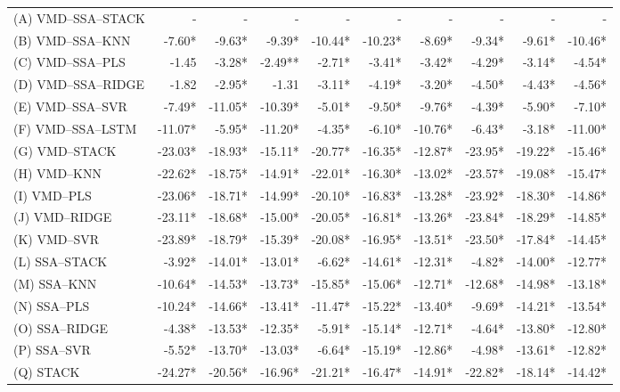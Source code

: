 {\begin{longtable}[htb!]{lrrrrrrrrr}
(A) VMD--SSA--STACK & -       & -       & -        & -       & -       & -       & -       & -       & -       \\
(B) VMD--SSA--KNN   & -7.60*  & -9.63*  & -9.39*   & -10.44* & -10.23* & -8.69*  & -9.34*  & -9.61*  & -10.46* \\
(C) VMD--SSA--PLS   & -1.45   & -3.28*  & -2.49**  & -2.71*  & -3.41*  & -3.42*  & -4.29*  & -3.14*  & -4.54*  \\
(D) VMD--SSA--RIDGE & -1.82   & -2.95*  & -1.31    & -3.11*  & -4.19*  & -3.20*  & -4.50*  & -4.43*  & -4.56*  \\
(E) VMD--SSA--SVR   & -7.49*  & -11.05* & -10.39*  & -5.01*  & -9.50*  & -9.76*  & -4.39*  & -5.90*  & -7.10*  \\
(F) VMD--SSA--LSTM  & -11.07* & -5.95*  & -11.20*  & -4.35*  & -6.10*  & -10.76* & -6.43*  & -3.18*  & -11.00* \\        
(G) VMD--STACK      & -23.03* & -18.93* & -15.11*  & -20.77* & -16.35* & -12.87* & -23.95* & -19.22* & -15.46* \\
(H) VMD--KNN        & -22.62* & -18.75* & -14.91*  & -22.01* & -16.30* & -13.02* & -23.57* & -19.08* & -15.47* \\
(I) VMD--PLS        & -23.06* & -18.71* & -14.99*  & -20.10* & -16.83* & -13.28* & -23.92* & -18.30* & -14.86* \\
(J) VMD--RIDGE      & -23.11* & -18.68* & -15.00*  & -20.05* & -16.81* & -13.26* & -23.84* & -18.29* & -14.85* \\
(K) VMD--SVR        & -23.89* & -18.79* & -15.39*  & -20.08* & -16.95* & -13.51* & -23.50* & -17.84* & -14.45* \\
(L) SSA--STACK      & -3.92*  & -14.01* & -13.01*  & -6.62*  & -14.61* & -12.31* & -4.82*  & -14.00* & -12.77* \\
(M) SSA--KNN        & -10.64* & -14.53* & -13.73*  & -15.85* & -15.06* & -12.71* & -12.68* & -14.98* & -13.18* \\
(N) SSA--PLS        & -10.24* & -14.66* & -13.41*  & -11.47* & -15.22* & -13.40* & -9.69*  & -14.21* & -13.54* \\
(O) SSA--RIDGE      & -4.38*  & -13.53* & -12.35*  & -5.91*  & -15.14* & -12.71* & -4.64*  & -13.80* & -12.80* \\
(P) SSA--SVR        & -5.52*  & -13.70* & -13.03*  & -6.64*  & -15.19* & -12.86* & -4.98*  & -13.61* & -12.82* \\
(Q) STACK           & -24.27* & -20.56* & -16.96*  & -21.21* & -16.47* & -14.91* & -22.82* & -18.14* & -14.42* \\

\end{longtable}}
